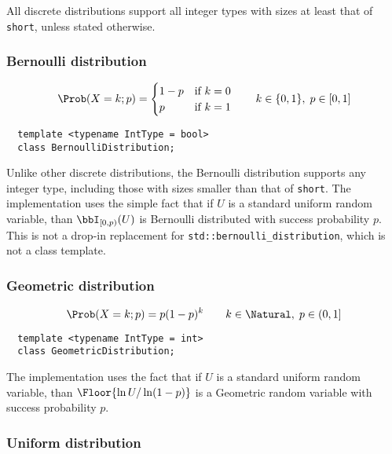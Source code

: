 All discrete distributions support all integer types with sizes at least that
of \verb|short|, unless stated otherwise.

\subsubsection{Bernoulli distribution}

\begin{equation*}
  \Prob(X = k;p) = \begin{cases}
    1 - p &\text{if } k = 0\\
    p     &\text{if } k = 1
  \end{cases} \qquad
  k \in \{0, 1\},\; p \in [0, 1]
\end{equation*}
\begin{Verbatim}
  template <typename IntType = bool>
  class BernoulliDistribution;
\end{Verbatim}
Unlike other discrete distributions, the Bernoulli distribution supports any
integer type, including those with sizes smaller than that of \verb|short|. The
implementation uses the simple fact that if $U$ is a standard uniform random
variable, than $\bbI_{[0,p)}(U)$ is Bernoulli distributed with success
probability $p$. This is not a drop-in replacement for
\verb|std::bernoulli_distribution|, which is not a class template.

\subsubsection{Geometric distribution}

\begin{equation*}
  \Prob(X = k;p) = p(1-p)^k \qquad
  k \in \Natural,\; p \in (0, 1]
\end{equation*}
\begin{Verbatim}
  template <typename IntType = int>
  class GeometricDistribution;
\end{Verbatim}
The implementation uses the fact that if $U$ is a standard uniform random
variable, than $\Floor{\ln U / \ln(1-p)}$ is a Geometric random variable with
success probability $p$.

\subsubsection{Uniform distribution}

